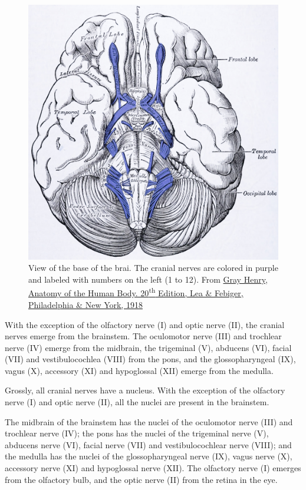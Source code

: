 \begin{figure}

{\centering \includegraphics[width=0.7\linewidth]{./figures/pns/GrayAnat1918p817} 

}

\caption{View of the base of the brai. The cranial nerves are colored in purple and labeled with numbers on the left (1 to 12). From \href{https://archive.org/details/anatomyofhumanbo1918gray/page/n6/mode/2up}{Gray Henry, Anatomy of the Human Body. 20\textsuperscript{th} Edition, Lea \& Febiger, Philadelphia \& New York, 1918}}\label{fig:baseofbrain}
\end{figure}

With the exception of the olfactory nerve (I) and optic nerve (II), the cranial nerves emerge from the brainstem. The oculomotor nerve (III) and trochlear nerve (IV) emerge from the midbrain, the trigeminal (V), abducens (VI), facial (VII) and vestibulocochlea (VIII) from the pons, and the glossopharyngeal (IX), vagus (X), accessory (XI) and hypoglossal (XII) emerge from the medulla.

Grossly, all cranial nerves have a nucleus. With the exception of the olfactory nerve (I) and optic nerve (II), all the nuclei are present in the brainstem.

The midbrain of the brainstem has the nuclei of the oculomotor nerve (III) and trochlear nerve (IV); the pons has the nuclei of the trigeminal nerve (V), abducens nerve (VI), facial nerve (VII) and vestibulocochlear nerve (VIII); and the medulla has the nuclei of the glossopharyngeal nerve (IX), vagus nerve (X), accessory nerve (XI) and hypoglossal nerve (XII). The olfactory nerve (I) emerges from the olfactory bulb, and the optic nerve (II) from the retina in the eye.

